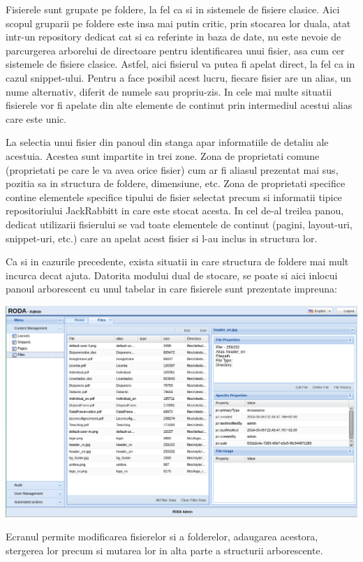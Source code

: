 Fisierele sunt grupate pe foldere, la fel ca si in sistemele de fisiere
clasice. Aici scopul gruparii pe foldere este insa mai putin critic,
prin stocarea lor duala, atat intr-un repository dedicat cat si ca
referinte in baza de date, nu este nevoie de parcurgerea arborelui
de directoare pentru identificarea unui fisier, asa cum cer sistemele
de fisiere clasice. Astfel, aici fisierul va putea fi apelat direct,
la fel ca in cazul snippet-ului. Pentru a face posibil acest lucru,
fiecare fisier are un alias, un nume alternativ, diferit de numele
sau propriu-zis. In cele mai multe situatii fisierele vor fi apelate
din alte elemente de continut prin intermediul acestui alias care
este unic. 

La selectia unui fisier din panoul din stanga apar informatiile de
detaliu ale acestuia. Acestea sunt impartite in trei zone. Zona de
proprietati comune (proprietati pe care le va avea orice fisier) cum
ar fi aliasul prezentat mai sus, pozitia sa in structura de foldere,
dimensiune, etc. Zona de proprietati specifice contine elementele
specifice tipului de fisier selectat precum si informatii tipice repositoriului
JackRabbitt in care este stocat acesta. In cel de-al treilea panou,
dedicat utilizarii fisierului se vad toate elementele de continut
(pagini, layout-uri, snippet-uri, etc.) care au apelat acest fisier
si l-au inclus in structura lor. 

Ca si in cazurile precedente, exista situatii in care structura de
foldere mai mult incurca decat ajuta. Datorita modului dual de stocare,
se poate si aici inlocui panoul arborescent cu unul tabelar in care
fisierele sunt prezentate impreuna:

\includegraphics[width=15cm]{cms/backend/files/files2}

Ecranul permite modificarea fisierelor si a folderelor, adaugarea
acestora, stergerea lor precum si mutarea lor in alta parte a structurii
arborescente. 

